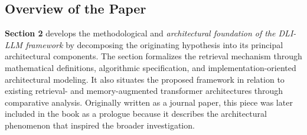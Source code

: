 \hypertarget{overview-of-the-paper}{%
\subsection{Overview of the Paper}}
\label{overview-of-the-paper}

\textbf{Section 2} develops the methodological and \emph{architectural foundation of the DLI-LLM framework}\footnotemark{} by decomposing the originating hypothesis into its principal architectural components. The section formalizes the retrieval mechanism through mathematical definitions, algorithmic specification, and implementation-oriented architectural modeling. It also situates the proposed framework in relation to existing retrieval- and memory-augmented transformer architectures through comparative analysis.
 Originally written as a journal paper, this piece was later included in the book as a prologue because it describes the architectural phenomenon that inspired the broader investigation.

